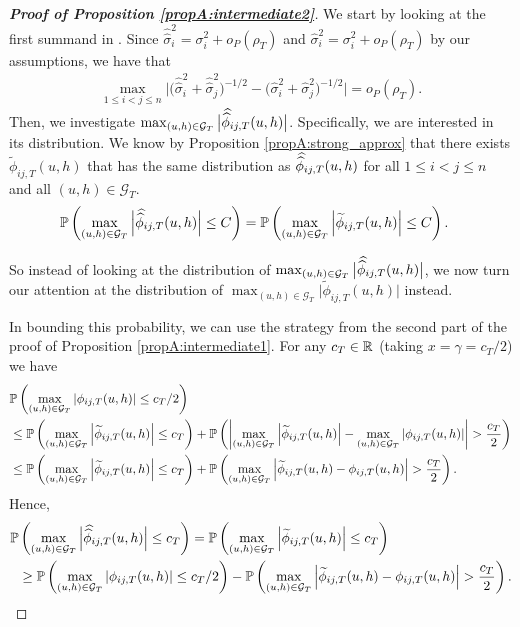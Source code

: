\documentclass[a4paper,12pt]{article}
\makeatletter
\renewcommand{\eqref}[1]{\tagform@{\ref{#1}}}
\newcommand{\doublehat}[1]{\skew{5.5}\widehat{\widehat{#1}}}
\newcommand{\doublehattwo}[1]{\widehat{\widehat{#1}}}
\makeatother
\begin{document}
\begin{proof}[\textnormal{\textbf{Proof of Proposition \ref{propA:intermediate2}}}]
We start by looking at the first summand in \eqref{ineq-diff-1}. Since $\doublehattwo{\sigma}_i^2 = \sigma_i^2 + o_P(\rho_T)$ and $\widehat{\sigma}_i^2 = \sigma_i^2 + o_P(\rho_T)$ by our assumptions, we have that 
\begin{align}\label{ineq-diff-2}
\max_{1 \le i < j \le n} \Big|\big(\doublehattwo{\sigma}_i^2 + \doublehattwo{\sigma}_j^2 \big)^{-1/2} - \big(\widehat{\sigma}_i^2 + \widehat{\sigma}_j^2 \big)^{-1/2}\Big| = o_P(\rho_T).
\end{align}
Then, we investigate $ \max_{(u,h) \in \mathcal{G}_T} \big|\doublehat{\phi}_{ij,T}(u,h)\big|$. Specifically, we are interested in its distribution. We know by Proposition \ref{propA:strong_approx} that there exists $\widetilde{\phi}_{ij, T}(u, h)$ that has the same distribution as $\doublehat{\phi}_{ij,T}(u,h)$ for all $1\le i < j \le n$ and all $(u, h) \in \mathcal{G}_T$.
\begin{align*}
\pr&\left(\max_{(u,h) \in \mathcal{G}_T}\Big|\doublehat{\phi}_{ij, T}(u, h)\Big| \leq C\right) = \pr\left(\max_{(u,h) \in \mathcal{G}_T}\left|\widetilde{\phi}_{ij, T}(u, h)\right| \leq C\right).
\end{align*}

So instead of looking at the distribution of $ \max_{(u,h) \in \mathcal{G}_T} \big|\doublehat{\phi}_{ij,T}(u,h)\big|$, we now turn our attention at the distribution of $ \max_{(u,h) \in \mathcal{G}_T}\big|\widetilde{\phi}_{ij, T}(u, h)\big|$ instead.

In bounding this probability, we can use the strategy from the second part of the proof of Proposition \ref{propA:intermediate1}. For any $c_T \in \mathbb{R}$ (taking $x = \gamma = c_T/2$) we have
\begin{align*}
&\mathbb{P}\left( \max_{(u,h) \in \mathcal{G}_T}\left|\phi_{ij, T}(u, h)\right| \leq c_T/2\right) \\
&\leq \mathbb{P}\left( \max_{(u,h) \in \mathcal{G}_T}\left|\widetilde{\phi}_{ij, T}(u, h)\right| \leq c_T\right) + \mathbb{P}\left(\left|\max_{(u,h) \in \mathcal{G}_T}\left|\widetilde{\phi}_{ij, T}(u, h)\right| - \max_{(u,h) \in \mathcal{G}_T}\left|\phi_{ij, T}(u, h)\right| \right| > \frac{c_T}{2}\right) \\
&\leq \mathbb{P}\left( \max_{(u,h) \in \mathcal{G}_T}\left|\widetilde{\phi}_{ij, T}(u, h)\right| \leq c_T\right) + \mathbb{P}\left(\max_{(u,h) \in \mathcal{G}_T}\left|\widetilde{\phi}_{ij, T}(u, h)- \phi_{ij, T}(u, h)\right| > \frac{c_T}{2}\right).
\end{align*}
Hence, 
\begin{align}\label{ineq-diff-3}
\begin{split}
\pr&\left(\max_{(u,h) \in \mathcal{G}_T}\Big|\doublehat{\phi}_{ij, T}(u, h)\Big| \leq c_T\right) = \pr\left(\max_{(u,h) \in \mathcal{G}_T}\left|\widetilde{\phi}_{ij, T}(u, h)\right| \leq c_T\right)\\
&\geq \pr\left( \max_{(u,h) \in \mathcal{G}_T}\left|\phi_{ij, T}(u, h)\right| \leq c_T/2\right) - \pr\left(\max_{(u,h) \in \mathcal{G}_T}\left|\widetilde{\phi}_{ij, T}(u, h)- \phi_{ij, T}(u, h)\right| > \frac{c_T}{2}\right).
\end{split}
\end{align}


\end{proof}
\end{document}
